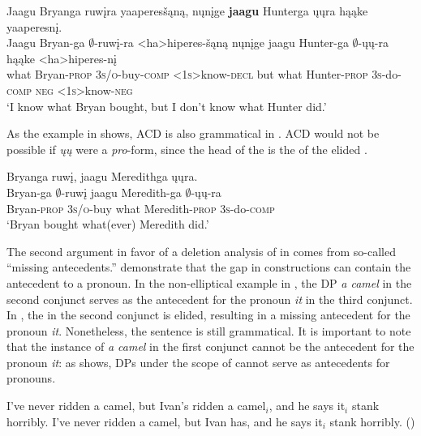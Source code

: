 \documentclass[output=paper]{LSP/langsci}
\begin{document}
{{\ex\label{ex:johnson:47b} 
\glll Jaagu Bryanga ruwįra yaaperesšąną, nųnįge \textbf{jaagu} Hunterga ųųra hąąke yaaperesnį.\\
Jaagu Bryan-ga $\emptyset$-ruwį-ra <ha>hiperes-šąną nųnįge jaagu Hunter-ga $\emptyset$-ųų-ra hąąke <ha>hiperes-nį\\
what Bryan-\textsc{prop} \textsc{3s/o}-buy-\textsc{comp} <\textsc{1s}>know-\textsc{decl} but what Hunter-\textsc{prop} \textsc{3s}-do-\textsc{comp} \textsc{neg} <\textsc{1s}>know-\textsc{neg}\\
\trans `I know what Bryan bought, but I don't know what Hunter did.'
\z
\z

As the example in  shows, ACD is also grammatical in . ACD would not be possible if \emph{ųų} were a \emph{pro}-form, since the head of the  is the  of the elided .
 
\ea\label{ex:johnson:48} 
\glll Bryanga ruwį, jaagu Meredithga ųųra.\\
Bryan-ga $\emptyset$-ruwį jaagu Meredith-ga $\emptyset$-ųų-ra\\
Bryan-\textsc{prop} \textsc{3s/o}-buy what Meredith-\textsc{prop} \textsc{3s}-do-\textsc{comp}\\
\trans `Bryan bought what(ever) Meredith did.'
\z

The second argument in favor of a deletion analysis of  in  comes from so-called ``missing antecedents.'' \citet{HankamerSag1976} demonstrate that the gap in   constructions can contain the antecedent to a pronoun. In the non-elliptical example in , the DP \emph{a camel} in the second conjunct serves as the antecedent for the pronoun \emph{it} in the third conjunct. In , the  in the second conjunct is elided, resulting in a missing antecedent for the pronoun \emph{it}. Nonetheless, the sentence is still grammatical. It is important to note that the instance of \emph{a camel} in the first conjunct cannot be the antecedent for the pronoun \emph{it}: as  shows, DPs under the scope of  cannot serve as antecedents for pronouns.

 
\ea
\ea\label{ex:johnson:49a}
I've never ridden a camel, but Ivan's ridden a camel$_i$, and he says it$_i$ stank horribly.
\vspace{12pt}
\ex\label{ex:johnson:49b} 
I've never ridden a camel, but Ivan has, and he says it$_i$ stank horribly. (\citealt[403]{HankamerSag1976})
\z
\z
 
}}
\end{document}
